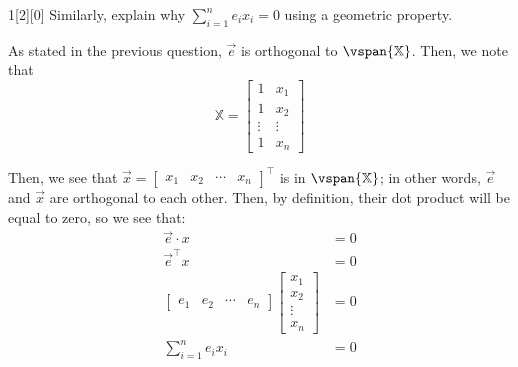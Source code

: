 \documentclass{article}
\begin{document}
\begin{dshw}{1}[2][0]
	Similarly, explain why $\sum\limits_{i = 1}^n e_ix_i = 0$ using a geometric property.
\end{dshw}
\begin{solution}
	As stated in the previous question, $\vec{e}$ is orthogonal to $\vspan{\mathbb X}$. Then, we note that 
	\begin{equation*}
		\mathbb X = \begin{bmatrix}
			1 & x_{1} \\ 1 & x_{2} \\ \vdots & \vdots \\ 1 & x_{n}
		\end{bmatrix}
	\end{equation*} 

	Then, we see that $\vec{x} = \begin{bmatrix} x_{1} & x_{2} & \cdots & x_{n} \end{bmatrix}^{\intercal}$ is in $\vspan{\mathbb X}$; in other words, $\vec e$ and $\vec{x}$ are orthogonal to each other. Then, by definition, their dot product will be equal to zero, so we see that:
	\begin{align*}
		\vec e \cdot x &= 0 \\
		\vec{e}^{\intercal}x &= 0 \\
		\begin{bmatrix} e_{1} & e_{2} & \cdots & e_{n} \end{bmatrix} \begin{bmatrix}
			x_{1} \\ x_{2} \\ \vdots \\ x_{n}
		\end{bmatrix} &= 0 \\
		\sum_{i=1}^{n} e_{i}x_{i} &= 0
	\end{align*}
\end{solution}
\end{document}
